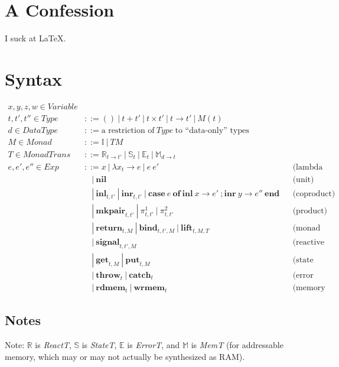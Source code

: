 \documentclass{article}[11pt]
\begin{document}
\section{A Confession}
I suck at \LaTeX.

\section{Syntax}
$$
\begin{aligned}
x,y,z,w \in \mathit{Variable}\\
t,t',t'' \in \mathit{Type} &::= ()~ |~ t + t'~ |~ t \times t'~ |~ t \rightarrow t'~ |~ M(t)\\
d \in \mathit{DataType} &::= \text{a restriction of}~ \mathit{Type}~ \text{to ``data-only'' types}\\
M \in \mathit{Monad} &::= \mathbb{I}~ |~ T M\\
T \in \mathit{MonadTrans} &::= \mathbb{R}_{t\rightarrow{}t'}~ |~ \mathbb{S}_t~ |~ \mathbb{E}_t~ |~ \mathbb{M}_{d\rightarrow{}t}\\
e,e',e'' \in \mathit{Exp}&::= x~ |~ \lambda{}x_t\rightarrow{}e~ |~ e~ e'&&\text{(lambda calculus)}\\
  &~~~~|~ \textbf{nil}&&\text{(unit)}\\
  &~~~~|~ \textbf{inl}_{t,t'}~ |~ \textbf{inr}_{t,t'}~ |~ \textbf{case}~ e~ \textbf{of}~ \textbf{inl}~ x \rightarrow e'~ ; \textbf{inr}~ y \rightarrow e''~ \textbf{end}&&\text{(coproduct)}\\
  &~~~~|~ \textbf{mkpair}_{t,t'}~ |~ \pi^1_{t,t'}~ |~ \pi^2_{t,t'}&&\text{(product)}\\
  &~~~~|~ \textbf{return}_{t,M}~ |~ \textbf{bind}_{t,t',M}~ |~ \textbf{lift}_{t,M,T}&&\text{(monad operators)}\\
  &~~~~|~ \textbf{signal}_{t,t',M}&&\text{(reactive prims.)}\\
  &~~~~|~ \textbf{get}_{t,M}~ |~ \textbf{put}_{t,M}&&\text{(state prims.)}\\
  &~~~~|~ \textbf{throw}_t~ |~ \textbf{catch}_t&&\text{(error prims.)}\\
  &~~~~|~ \textbf{rdmem}_t~ |~ \textbf{wrmem}_t&&\text{(memory prims.)}
\end{aligned}
$$

\subsection{Notes}
Note: $\mathbb{R}$ is {\it ReactT}, $\mathbb{S}$ is {\it StateT}, $\mathbb{E}$ is {\it ErrorT}, and $\mathbb{M}$ is {\it MemT} (for addressable memory, which may or may not actually be synthesized as RAM).
\end{document}
